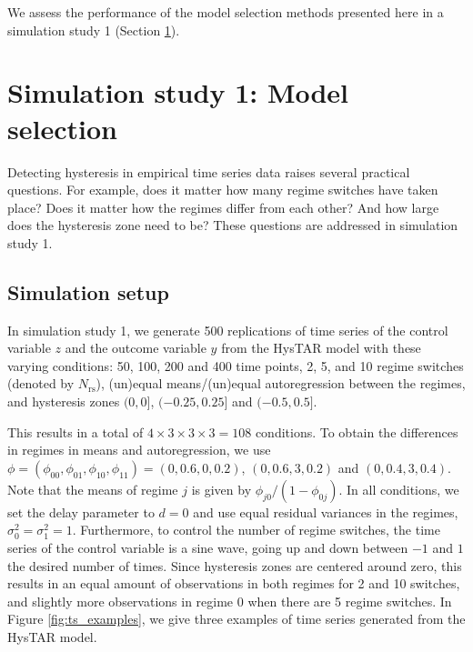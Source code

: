 \documentclass{article}
\begin{document}
We assess the performance of the model selection methods presented here in a simulation study 1 (Section \ref{sec:simulation_study_1}).

\section{Simulation study 1: Model selection}
\label{sec:simulation_study_1}
Detecting hysteresis in empirical time series data raises several practical questions.
For example, does it matter how many regime switches have taken place?
Does it matter how the regimes differ from each other?
And how large does the hysteresis zone need to be?
These questions are addressed in simulation study 1.

\subsection{Simulation setup}
In simulation study 1, we generate 500 replications of time series of the control variable $z$ and the outcome variable $y$ from the HysTAR model with these varying conditions: 50, 100, 200 and 400 time points, 2, 5, and 10 regime switches (denoted by $N_{\mathrm{rs}}$), (un)equal means/(un)equal autoregression between the regimes, and hysteresis zones $(0, 0]$, $(-0.25, 0.25]$ and $(-0.5, 0.5]$.

This results in a total of $4 \times 3 \times 3 \times 3 = 108$ conditions.
To obtain the differences in regimes in means and autoregression, we use $\phi = (\phi_{00}, \phi_{01}, \phi_{10}, \phi_{11}) = (0, 0.6, 0, 0.2)$, $(0, 0.6, 3, 0.2)$ and $(0, 0.4, 3, 0.4)$. Note that the means of regime $j$ is given by $\phi_{j0}/(1 - \phi_{0j})$.
In all conditions, we set the delay parameter to $d = 0$ and use equal residual variances in the regimes, $\sigma_0^2 = \sigma_1^2 = 1$. 
Furthermore, to control the number of regime switches, the time series of the control variable is a sine wave, going up and down between $-1$ and $1$ the desired number of times.
Since hysteresis zones are centered around zero, this results in an equal amount of observations in both regimes for 2 and 10 switches, and slightly more observations in regime 0 when there are 5 regime switches.
In Figure \ref{fig:ts_examples}, we give three examples of time series generated from the HysTAR model.
\end{document}
